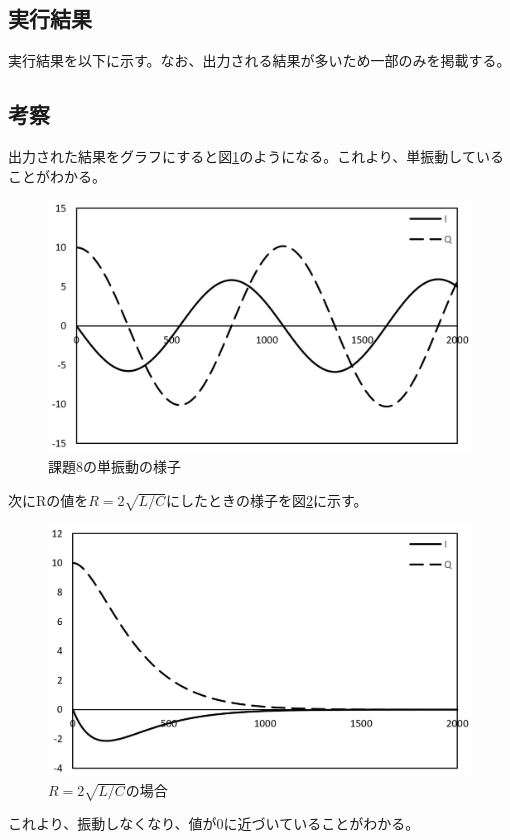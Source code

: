 \documentclass[11pt,titlepage]{jsarticle}
\begin{document}
\subsection{実行結果}
実行結果を以下に示す。なお、出力される結果が多いため一部のみを掲載する。
\begin{oframed}
\end{oframed}

\subsection{考察}
出力された結果をグラフにすると図\ref{fig:kadai8}のようになる。これより、単振動していることがわかる。
\begin{figure}[H]
\centering
\includegraphics[width=12cm]{img/kadai8.png}
\caption{課題8の単振動の様子}
\label{fig:kadai8}
\end{figure}

次にRの値を$R=2\sqrt{L/C}$にしたときの様子を図\ref{fig:kadai8_R}に示す。
\begin{figure}[H]
\centering
\includegraphics[width=12cm]{img/kadai8_R.png}
\caption{$R=2\sqrt{L/C}$の場合}
\label{fig:kadai8_R}
\end{figure}

これより、振動しなくなり、値が0に近づいていることがわかる。
\end{document}
